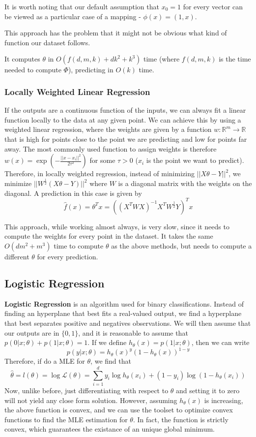 \documentclass{article}
\newcommand{\R}{\mathbb{R}}
\begin{document}
It is worth noting that our default assumption that $x_0 = 1$ for every vector can be viewed as a particular case of a mapping - $\phi(x) = (1, x)$.

This approach has the problem that it might not be obvious what kind of function our dataset follows.

It computes $\theta$ in $O(f(d,m,k) + dk^2 + k^3)$ time (where $f(d,m,k)$ is the time needed to compute $\Phi$), predicting in $O(k)$ time.

\subsubsection{Locally Weighted Linear Regression}

If the outputs are a continuous function of the inputs, we can always fit a linear function locally to the data at any given point.
We can achieve this by using a weighted linear regression, where the weights are given by a function $w: \R^m \to \R$ that is high for points close to the point we are predicting and low for points far away.
The most commonly used function to assign weights is therefore $w(x) = \exp(-\frac{||x - x_i||^2}{2\tau^2})$ for some $\tau > 0$ ($x_i$ is the point we want to predict).
Therefore, in locally weighted regression, instead of minimizing $||X \theta - Y||^2$, we minimize $||W^{\frac{1}{2}}(X \theta - Y)||^2$ where $W$ is a diagonal matrix with the weights on the diagonal.
A prediction in this case is given by
$$
\hat{f}(x) = \theta^T x = ((X^T W X)^{-1} X^T W^{\frac{1}{2}} Y)^T x
$$

This approach, while working almost always, is very slow, since it needs to compute the weights for every point in the dataset.
It takes the same $O(dm^2 + m^3)$ time to compute $\theta$ as the above methods, but needs to compute a different $\theta$ for every prediction.

\subsection{Logistic Regression}

\textbf{Logistic Regression} is an algorithm used for binary classifications. 
Instead of finding an hyperplane that best fits a real-valued output, we find a hyperplane that best separates positive and negatives observations.
We will then assume that our outputs are in $\{0, 1\}$, and it is reasonable to assume that $p(0 | x ; \theta) + p(1 | x ; \theta) = 1$.
If we define $h_\theta(x) = p(1 | x ; \theta)$, then we can write
$$
p(y | x ; \theta) = h_\theta(x)^y (1 - h_\theta(x))^{1 - y}
$$
Therefore, if do a MLE for $\theta$, we find that 
$$
\hat{\theta} = l(\theta) = \log \mathcal{L}(\theta) = \sum_{i=1}^d y_i \log h_\theta(x_i) + (1 - y_i) \log (1 - h_\theta(x_i))
$$
Now, unlike before, just differentiating with respect to $\theta$ and setting it to zero will not yield any close form solution.
However, assuming $h_\theta(x)$ is increasing, the above function is convex, and we can use the toolset to optimize convex functions to find the MLE estimation for $\theta$.
In fact, the function is strictly convex, which guarantees the existance of an unique global minimum.
\end{document}
